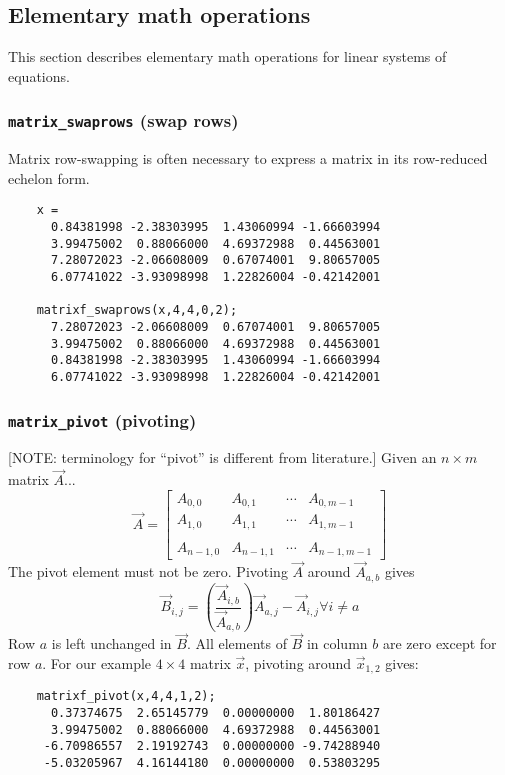 % 
%
\subsection{Elementary math operations}
\label{module:matrix:elementary}
This section describes elementary math operations for linear systems of
equations.

\subsubsection{{\tt matrix\_swaprows} (swap rows)}
\label{module:matrix:swaprows}
Matrix row-swapping is often necessary to express a matrix in its row-reduced
echelon form.
\begin{verbatim}
    x = 
      0.84381998 -2.38303995  1.43060994 -1.66603994
      3.99475002  0.88066000  4.69372988  0.44563001
      7.28072023 -2.06608009  0.67074001  9.80657005
      6.07741022 -3.93098998  1.22826004 -0.42142001

    matrixf_swaprows(x,4,4,0,2);
      7.28072023 -2.06608009  0.67074001  9.80657005
      3.99475002  0.88066000  4.69372988  0.44563001
      0.84381998 -2.38303995  1.43060994 -1.66603994
      6.07741022 -3.93098998  1.22826004 -0.42142001
\end{verbatim}

\subsubsection{{\tt matrix\_pivot} (pivoting)}
\label{module:matrix:pivot}
[NOTE: terminology for ``pivot'' is different from literature.]
Given an $n \times m$ matrix $\vec{A}$...
\[
    \vec{A} = 
    \begin{bmatrix}
        A_{0,0}     & A_{0,1}   & \cdots  & A_{0,m-1} \\
        A_{1,0}     & A_{1,1}   & \cdots  & A_{1,m-1} \\
        \\
        A_{n-1,0}   & A_{n-1,1} & \cdots  & A_{n-1,m-1}
    \end{bmatrix}
\]
The pivot element must not be zero.
Pivoting $\vec{A}$ around $\vec{A}_{a,b}$ gives
\[
    \vec{B}_{i,j} = \left(
                    \frac{\vec{A}_{i,b}}{\vec{A}_{a,b}}
                    \right)
                    \vec{A}_{a,j} - \vec{A}_{i,j}
                    \forall i \ne a
\]
Row $a$ is left unchanged in $\vec{B}$.
All elements of $\vec{B}$ in column $b$ are zero except for row $a$.
For our example $4 \times 4$ matrix $\vec{x}$, pivoting around
$\vec{x}_{1,2}$ gives:
\begin{verbatim}
    matrixf_pivot(x,4,4,1,2);
      0.37374675  2.65145779  0.00000000  1.80186427
      3.99475002  0.88066000  4.69372988  0.44563001
     -6.70986557  2.19192743  0.00000000 -9.74288940
     -5.03205967  4.16144180  0.00000000  0.53803295
\end{verbatim}

